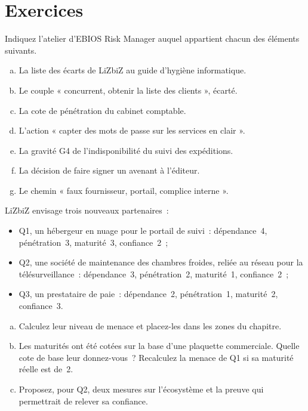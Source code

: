 \section*{Exercices}

\begin{boxexo}[title={\ding{45}\quad Exercice~4.1. À quel atelier~? \niveaubase}]
Indiquez l'atelier d'EBIOS Risk Manager auquel appartient chacun des
éléments suivants.
\begin{enumerate}[(a)]
    \item La liste des écarts de LiZbiZ au guide d'hygiène informatique.
    \item Le couple « concurrent, obtenir la liste des clients », écarté.
    \item La cote de pénétration du cabinet comptable.
    \item L'action « capter des mots de passe sur les services en clair ».
    \item La gravité G4 de l'indisponibilité du suivi des expéditions.
    \item La décision de faire signer un avenant à l'éditeur.
    \item Le chemin « faux fournisseur, portail, complice interne ».
\end{enumerate}
\end{boxexo}

\begin{boxexo}[title={\ding{45}\quad Exercice~4.2. Trois nouvelles parties prenantes \niveaumoyen}]
LiZbiZ envisage trois nouveaux partenaires~:
\begin{itemize}
    \item Q1, un hébergeur en nuage pour le portail de suivi~:
          dépendance~4, pénétration~3, maturité~3, confiance~2~;
    \item Q2, une société de maintenance des chambres froides, reliée au
          réseau pour la télésurveillance~: dépendance~3, pénétration~2,
          maturité~1, confiance~2~;
    \item Q3, un prestataire de paie~: dépendance~2, pénétration~1,
          maturité~2, confiance~3.
\end{itemize}
\begin{enumerate}[(a)]
    \item Calculez leur niveau de menace et placez-les dans les zones du
          chapitre.
    \item Les maturités ont été cotées sur la base d'une plaquette
          commerciale. Quelle cote de base leur donnez-vous~? Recalculez la
          menace de Q1 si sa maturité réelle est de~2.
    \item Proposez, pour Q2, deux mesures sur l'écosystème et la preuve
          qui permettrait de relever sa confiance.
\end{enumerate}
\end{boxexo}

